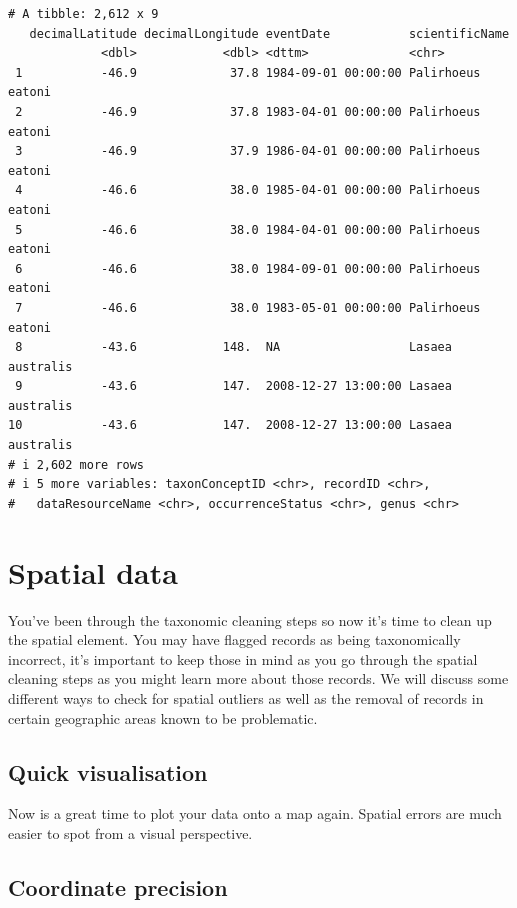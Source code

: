 \documentclass[
  letterpaper,
  DIV=11,
  numbers=noendperiod,
  oneside]{scrreprt}
\begin{document}
\begin{verbatim}
# A tibble: 2,612 x 9
   decimalLatitude decimalLongitude eventDate           scientificName   
             <dbl>            <dbl> <dttm>              <chr>            
 1           -46.9             37.8 1984-09-01 00:00:00 Palirhoeus eatoni
 2           -46.9             37.8 1983-04-01 00:00:00 Palirhoeus eatoni
 3           -46.9             37.9 1986-04-01 00:00:00 Palirhoeus eatoni
 4           -46.6             38.0 1985-04-01 00:00:00 Palirhoeus eatoni
 5           -46.6             38.0 1984-04-01 00:00:00 Palirhoeus eatoni
 6           -46.6             38.0 1984-09-01 00:00:00 Palirhoeus eatoni
 7           -46.6             38.0 1983-05-01 00:00:00 Palirhoeus eatoni
 8           -43.6            148.  NA                  Lasaea australis 
 9           -43.6            147.  2008-12-27 13:00:00 Lasaea australis 
10           -43.6            147.  2008-12-27 13:00:00 Lasaea australis 
# i 2,602 more rows
# i 5 more variables: taxonConceptID <chr>, recordID <chr>,
#   dataResourceName <chr>, occurrenceStatus <chr>, genus <chr>
\end{verbatim}


\hypertarget{sec-spatial}{%
\chapter{Spatial data}\label{sec-spatial}}

You've been through the taxonomic cleaning steps so now it's time to
clean up the spatial element. You may have flagged records as being
taxonomically incorrect, it's important to keep those in mind as you go
through the spatial cleaning steps as you might learn more about those
records. We will discuss some different ways to check for spatial
outliers as well as the removal of records in certain geographic areas
known to be problematic.

\hypertarget{quick-visualisation}{%
\section{Quick visualisation}\label{quick-visualisation}}

Now is a great time to plot your data onto a map again. Spatial errors
are much easier to spot from a visual perspective.

\hypertarget{coordinate-precision}{%
\section{Coordinate precision}\label{coordinate-precision}}
\end{document}
